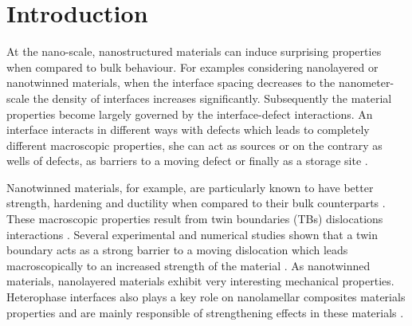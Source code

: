 \documentclass[final,3p,times,twocolumn]{elsarticle}
\begin{document}
\section{Introduction}


At the nano-scale, nanostructured materials can induce surprising properties when compared to bulk behaviour. For examples considering nanolayered or nanotwinned materials, when the interface spacing decreases to the nanometer-scale the density of interfaces increases significantly. Subsequently the material properties become largely governed by the interface-defect interactions. An interface interacts in different ways with defects which leads to completely different macroscopic properties, she can act as sources or on the contrary as wells of defects, as barriers to a moving defect or finally as a storage site \cite{beyerlein15PMS}. 

Nanotwinned materials, for example, are particularly known to have better strength, hardening and ductility when compared to their bulk counterparts \cite{lu04S,lu09S,stukowski10PRB,sansoz07NL}. These macroscopic properties result from twin boundaries (TBs) dislocations interactions . Several experimental and numerical studies shown that a twin boundary acts as a strong barrier to a moving dislocation which leads macroscopically to an increased strength of the material \cite{wu09AM,deng09NL,cao15SM}. As nanotwinned materials, nanolayered materials exhibit very interesting mechanical properties. Heterophase interfaces also plays a key role on nanolamellar composites materials properties and are mainly responsible of strengthening effects in these materials \cite{misra01AEM,misra05AM}. 
\end{document}
